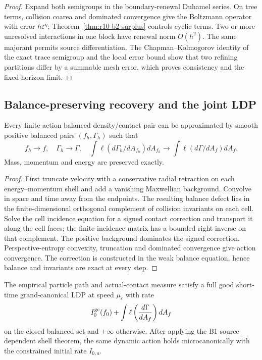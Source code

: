 \begin{proof}
Expand both semigroups in the boundary-renewal Duhamel series.  On tree terms,
collision coarea and dominated convergence give the Boltzmann operator with
error \(h\varepsilon^\eta\); Theorem~\ref{thm:r10-b2-surplus} controls cyclic
terms.  Two or more unresolved interactions in one block have renewal norm
\(O(h^2)\).  The same majorant permits source differentiation.  The
Chapman--Kolmogorov identity of the exact trace semigroup and the local error
bound show that two refining partitions differ by a summable mesh error,
which proves consistency and the fixed-horizon limit.
\end{proof}

\subsection{Balance-preserving recovery and the joint LDP}

\begin{lemma}
\label{lem:r10-b2-repair}
Every finite-action balanced density/contact pair can be approximated by
smooth positive balanced pairs \((f_h,\Gamma_h)\) such that
\[
 f_h\to f,
 \quad \Gamma_h\to\Gamma,
 \quad
 \int\ell(d\Gamma_h/dA_{f_h})dA_{f_h}\to
 \int\ell(d\Gamma/dA_f)dA_f.
\]
Mass, momentum and energy are preserved exactly.
\end{lemma}

\begin{proof}
First truncate velocity with a conservative radial retraction on each
energy--momentum shell and add a vanishing Maxwellian background.  Convolve in
space and time away from the endpoints.  The resulting balance defect lies in
the finite-dimensional orthogonal complement of collision invariants on each
cell.  Solve the cell incidence equation for a signed contact correction and
transport it along the cell faces; the finite incidence matrix has a bounded
right inverse on that complement.  The positive background dominates the
signed correction.  Perspective-entropy convexity, truncation and dominated
convergence give action convergence.  The correction is constructed in the
weak balance equation, hence balance and invariants are exact at every step.
\end{proof}

\begin{theorem}
\label{thm:r10-b2-main}
The empirical particle path and actual-contact measure satisfy a full good
short-time grand-canonical LDP at speed \(\mu_\varepsilon\) with rate
\[
 I_0^{\rm gc}(f_0)+
 \int\ell\left(\frac{d\Gamma}{dA_f}\right)dA_f
\]
on the closed balanced set and \(+\infty\) otherwise.  After applying the B1
source-dependent shell theorem, the same dynamic action holds
microcanonically with the constrained initial rate \(I_{0,a}\).
\end{theorem}

